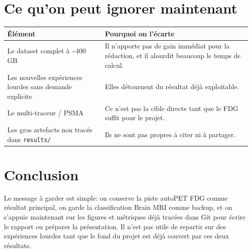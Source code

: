 \documentclass[11pt,a4paper]{article}
\begin{document}
\section{Ce qu'on peut ignorer maintenant}

\begin{tabularx}{\linewidth}{L{5.2cm}Y}
\toprule
\textbf{Élément} & \textbf{Pourquoi on l'écarte} \\
\midrule
Le dataset complet à \textasciitilde 400 GB & Il n'apporte pas de gain immédiat pour la rédaction, et il alourdit beaucoup le temps de calcul. \\
Les nouvelles expériences lourdes sans demande explicite & Elles détournent du résultat déjà exploitable. \\
Le multi-traceur / PSMA & Ce n'est pas la cible directe tant que le FDG suffit pour le projet. \\
Les gros artefacts non tracés dans \texttt{results/} & Ils ne sont pas propres à citer ni à partager. \\
\bottomrule
\end{tabularx}

\section{Conclusion}

Le message à garder est simple: on conserve la piste autoPET FDG comme résultat
principal, on garde la classification Brain MRI comme backup, et on s'appuie
maintenant sur les figures et métriques déjà tracées dans Git pour écrire le
rapport ou préparer la présentation. Il n'est pas utile de repartir sur des
expériences lourdes tant que le fond du projet est déjà couvert par ces deux
résultats.
\end{document}

